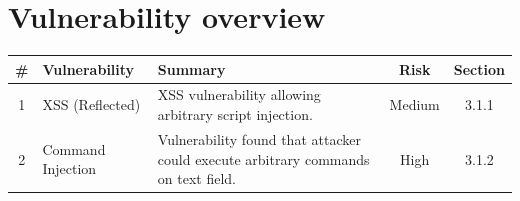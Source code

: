 \chapter{Vulnerability overview}

\begin{table}[h]
    \begin{tabular}{|c|p{4cm}|p{7cm}|c|c|}
        \hline
        \# & Vulnerability  & Summary & Risk& Section \\
        \hline
        1 & XSS (Reflected)   & XSS vulnerability allowing arbitrary script injection.& Medium & 3.1.1\\
        \hline
        2 & Command Injection   & Vulnerability found that attacker could execute arbitrary commands on text field.& High & 3.1.2\\
        \hline
    \end{tabular}
\end{table}